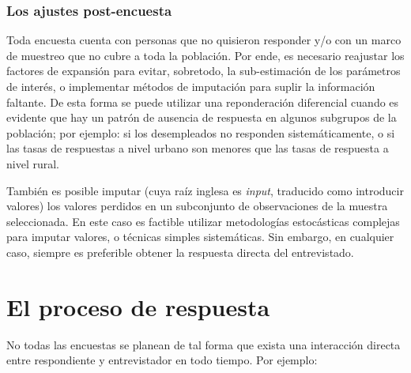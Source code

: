 \documentclass[
  12pt,
  spanish,
]{book}
\begin{document}
\hypertarget{los-ajustes-post-encuesta}{%
\subsubsection{Los ajustes post-encuesta}\label{los-ajustes-post-encuesta}}

Toda encuesta cuenta con personas que no quisieron responder y/o con un marco de muestreo que no cubre a toda la población. Por ende, es necesario reajustar los factores de expansión para evitar, sobretodo, la sub-estimación de los parámetros de interés, o implementar métodos de imputación para suplir la información faltante. De esta forma se puede utilizar una reponderación diferencial cuando es evidente que hay un patrón de ausencia de respuesta en algunos subgrupos de la población; por ejemplo: si los desempleados no responden sistemáticamente, o si las tasas de respuestas a nivel urbano son menores que las tasas de respuesta a nivel rural.

También es posible imputar (cuya raíz inglesa es \emph{input}, traducido como introducir valores) los valores perdidos en un subconjunto de observaciones de la muestra seleccionada. En este caso es factible utilizar metodologías estocásticas complejas para imputar valores, o técnicas simples sistemáticas. Sin embargo, en cualquier caso, siempre es preferible obtener la respuesta directa del entrevistado.

\hypertarget{el-proceso-de-respuesta}{%
\section{El proceso de respuesta}\label{el-proceso-de-respuesta}}

No todas las encuestas se planean de tal forma que exista una interacción directa entre respondiente y entrevistador en todo tiempo. Por ejemplo:
\end{document}
